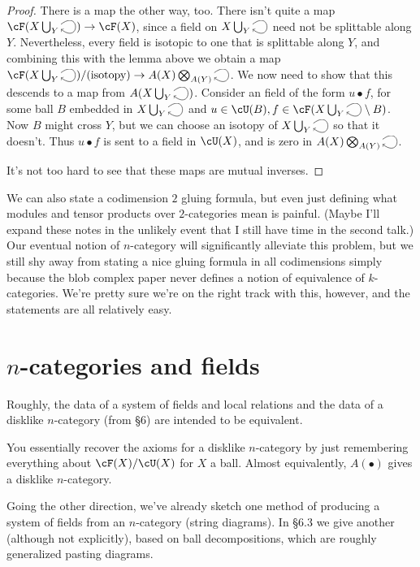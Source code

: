 \documentclass[11pt]{amsart}
\theoremstyle{plain}
\newcommand{\selfarrow}{\ensuremath{\smash{\tikz[baseline]{\clip (0,0.36) rectangle (0.48,-0.16); \draw[->] (0,0.175) .. controls (0.6,0.65) and (0.6,-0.45) .. (0,0.025);}}}}
\newcommand{\Tensor}{\bigotimes}
\begin{document}
\begin{proof}
There is a map the other way, too. There isn't quite a map $\cF(X \bigcup_Y \selfarrow) \to \cF(X)$, since a field on $X \bigcup_Y \selfarrow$ need not be splittable along $Y$. Nevertheless, every field is isotopic to one that is splittable along $Y$, and combining this with the lemma above we obtain a map $\cF(X \bigcup_Y \selfarrow) / (\text{isotopy}) \to A(X)  \Tensor_{A(Y)} \selfarrow$. We now need to show that this descends to a map from $A(X \bigcup_Y \selfarrow)$. Consider an field of the form $u \bullet f$, for some ball $B$ embedded in $X \bigcup_Y \selfarrow$ and $u \in \cU(B), f \in \cF(X \bigcup_Y \selfarrow \setminus B)$. Now $B$ might cross $Y$, but we can choose an isotopy of $X \bigcup_Y \selfarrow$ so that it doesn't. Thus $u \bullet f$ is sent to a field in $\cU(X)$, and is zero in $A(X)  \Tensor_{A(Y)} \selfarrow$.

It's not too hard to see that these maps are mutual inverses.
\end{proof}

We can also state a codimension $2$ gluing formula, but even just defining what modules and tensor products over $2$-categories mean is painful. (Maybe I'll expand these notes in the unlikely event that I still have time in the second talk.) Our eventual notion of $n$-category will significantly alleviate this problem, but we still shy away from stating a nice gluing formula in all codimensions simply because the blob complex paper never defines a notion of equivalence of $k$-categories. We're pretty sure we're on the right track with this, however, and the statements are all relatively easy.

\section{$n$-categories and fields}
Roughly, the data of a system of fields and local relations and the data of a disklike $n$-category (from \S 6) are intended to be equivalent.

You essentially recover the axioms for a disklike $n$-category by just remembering everything about $\cF(X) / \cU(X)$ for $X$ a ball. 
Almost equivalently, $A(\bullet)$ gives a disklike $n$-category.

Going the other direction, we've already sketch one method of producing a system of fields from an $n$-category (string diagrams). In \S 6.3 we give another (although not explicitly), based on ball decompositions, which are roughly generalized pasting diagrams.
\end{document}
